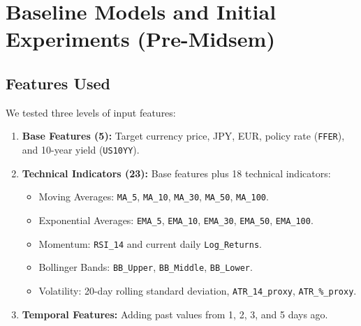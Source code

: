 \section{Baseline Models and Initial Experiments (Pre-Midsem)}

\subsection{Features Used}
We tested three levels of input features:
\begin{enumerate}[leftmargin=1.5cm, itemsep=1pt]
	\item \textbf{Base Features (5):} Target currency price, JPY, EUR, policy rate (\texttt{FFER}), and 10-year yield (\texttt{US10YY}).
	\item \textbf{Technical Indicators (23):} Base features plus 18 technical indicators:
	\begin{itemize}
		\item Moving Averages: \texttt{MA\_5}, \texttt{MA\_10}, \texttt{MA\_30}, \texttt{MA\_50}, \texttt{MA\_100}.
		\item Exponential Averages: \texttt{EMA\_5}, \texttt{EMA\_10}, \texttt{EMA\_30}, \texttt{EMA\_50}, \texttt{EMA\_100}.
		\item Momentum: \texttt{RSI\_14} and current daily \texttt{Log\_Returns}.
		\item Bollinger Bands: \texttt{BB\_Upper}, \texttt{BB\_Middle}, \texttt{BB\_Lower}.
		\item Volatility: 20-day rolling standard deviation, \texttt{ATR\_14\_proxy}, \texttt{ATR\_\%\_proxy}.
	\end{itemize}
	\item \textbf{Temporal Features:} Adding past values from 1, 2, 3, and 5 days ago.
\end{enumerate}

